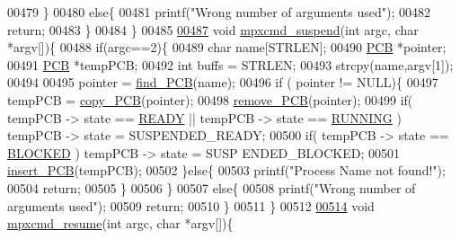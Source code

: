\begin{DoxyCode}
{{00479         \}
00480         \textcolor{keywordflow}{else}\{
00481                 printf(\textcolor{stringliteral}{"Wrong number of arguments used"});       
00482                 \textcolor{keywordflow}{return};
00483         \}
00484 \}
00485 
\hypertarget{mpx__r2_8c_source_l00487}{}\hyperlink{mpx__r2_8h_a697f0f432dba18606d9e514eda9cd073}{00487} \textcolor{keywordtype}{void} \hyperlink{mpx__r2_8c_a697f0f432dba18606d9e514eda9cd073}{mpxcmd_suspend}(\textcolor{keywordtype}{int} argc, \textcolor{keywordtype}{char} *argv[])\{
00488         \textcolor{keywordflow}{if}(argc==2)\{
00489                 \textcolor{keywordtype}{char} name[STRLEN];
00490                 \hyperlink{structprocess}{PCB} *pointer;
00491                 \hyperlink{structprocess}{PCB} *tempPCB;
00492                 \textcolor{keywordtype}{int} buffs = STRLEN;
00493                 strcpy(name,argv[1]);
00494                 
00495                 pointer = \hyperlink{mpx__r2_8c_a612a6abcb66c688a32f33abc93ff3990}{find_PCB}(name);
00496                 \textcolor{keywordflow}{if} ( pointer != NULL)\{
00497                         tempPCB = \hyperlink{mpx__r2_8c_aca3ad02d2b4c68f7653b0adf2c484ff6}{copy_PCB}(pointer);
00498                         \hyperlink{mpx__r2_8c_af30a3658210d449b4b53e5be2ed2bc2e}{remove_PCB}(pointer);
00499                         \textcolor{keywordflow}{if}( tempPCB -> state == \hyperlink{mpx__r2_8h_ad1235d5ce36f7267285e82dccd428aa6}{READY} || tempPCB -> state == 
      \hyperlink{mpx__r2_8h_a6fb7181d994ee98e735494be55809708}{RUNNING} ) tempPCB -> state = SUSPENDED\_READY;
00500                         \textcolor{keywordflow}{if}( tempPCB -> state == \hyperlink{mpx__r2_8h_a48f6457243719e7031768d4100741159}{BLOCKED} ) tempPCB -> state = SUSP
      ENDED\_BLOCKED;
00501                         \hyperlink{mpx__r2_8c_aa3b334e3a5afd6e590917667ad359a6f}{insert_PCB}(tempPCB);
00502                 \}\textcolor{keywordflow}{else}\{
00503                         printf(\textcolor{stringliteral}{"Process Name not found!"});
00504                         \textcolor{keywordflow}{return};
00505                 \}
00506         \}
00507         \textcolor{keywordflow}{else}\{
00508                 printf(\textcolor{stringliteral}{"Wrong number of arguments used"});       
00509                 \textcolor{keywordflow}{return};
00510         \}
00511 \}
00512 
\hypertarget{mpx__r2_8c_source_l00514}{}\hyperlink{mpx__r2_8h_a3c47daf087934d234d896e35e4c03f3b}{00514} \textcolor{keywordtype}{void} \hyperlink{mpx__r2_8c_a3c47daf087934d234d896e35e4c03f3b}{mpxcmd_resume}(\textcolor{keywordtype}{int} argc, \textcolor{keywordtype}{char} *argv[])\{
}}
\end{DoxyCode}
